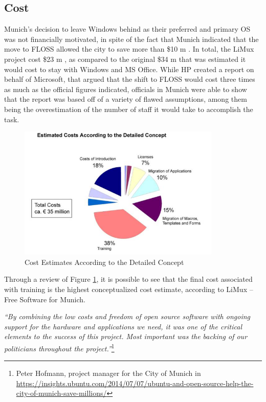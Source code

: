 \subsection{Cost}

Munich’s decision to leave Windows behind as their preferred and primary OS was not financially motivated, in spite of the fact that Munich indicated that the move to FLOSS allowed the city to save more than \$10 m . In total, the LiMux project cost  \$23 m , as compared to the original  \$34 m  that was estimated it would cost to stay with Windows and MS Office. While HP created a report on behalf of Microsoft, that argued that the shift to FLOSS would cost three times as much as the official figures indicated, officials in Munich were able to show that the report was based off of a variety of flawed assumptions, among them being the overestimation of the number of staff it would take to accomplish the task.

 \begin{figure}
 \centering
     \includegraphics[width=0.86\textwidth]{img/cost_limux_estimates.png}
   \caption  [Limux cost estimates]{Cost Estimates According to the Detailed Concept \protect\footnotemark}  
   \label{fig:cost_limux_estimates}
 \end{figure}

Through a review of Figure \ref{fig:cost_limux_estimates}, it is possible to see that the final cost associated with training is the highest conceptualized cost estimate, according to LiMux – Free Software for Munich. 

\textit{“By combining the low costs and freedom of open source software with ongoing support for the hardware and applications we need, it was one of the critical elements to the success of this project. Most important was the backing of our politicians throughout the project.”}\footnote{Peter Hofmann, project manager for the City of Munich in \url{https://insights.ubuntu.com/2014/07/07/ubuntu-and-open-source-help-the-city-of-munich-save-millions/}}

